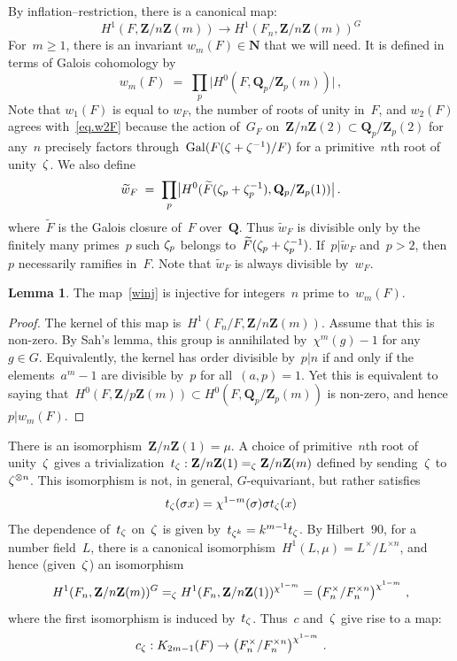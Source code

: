 \documentclass[12pt,reqno]{amsart}
\theoremstyle{definition}
\newtheorem{lemma}[theorem]{Lemma}
\newcommand{\changed}[1]{{#1}}
\def\be{\begin{equation}}
\def\ee{\end{equation}}
\def\={\;=\;}
\def\Q{\mathbf Q}   %
\def\Z{\mathbf Z}   %
\def\N{\mathbf N}   %
\def\nn{n}
\def\Gal{\mathrm{Gal}}
\def\Fgal{\widetilde{F}}
\def\ww{\widetilde w_F}
\begin{document}
By inflation--restriction, there is a canonical map: 
\be
\label{winj}
H^1(F,\Z/\nn\Z(m) ) \rightarrow H^1(F_\nn,\Z/\nn\Z(m) )^{G}
\ee
For~$m \ge 1$, there is an invariant $w_m(F)\in\N$ that we will need.
It is defined in terms of Galois cohomology by
$$ 
w_m(F) \= \prod_{p} \bigl|H^0(F,\Q_p/\Z_p(m) )\bigr|\,, 
$$
Note that $w_1(F)$ is equal to $w_F$, the number of 
roots of unity in~$F$, and $w_2(F)$ agrees with~\eqref{eq.w2F} 
\changed{because the action of~$G_F$ on~$\Z/\nn \Z(2) \subset \Q_p/\Z_p(2)$ for any~$\nn$
precisely factors through~$\Gal(F(\z + \z^{-1})/F)$ for a primitive~$\nn$th root
of unity~$\zeta$.}
We also define
\be
\label{wtwiddle}
\ww \= \prod_{p} \bigl|H^0(\Fgal(\z_p + \z^{-1}_p),\Q_p/\Z_p(1))\bigr|\,. 
\ee
where~$\Fgal$ is the Galois closure of~$F$ over~$\Q$.
Thus $\ww$ is divisible only by the finitely many primes~$p$ such $\zeta_p$ 
belongs to~$\Fgal(\z_p + \z\i_p)$. If~$p|\ww$ and~$p > 2$, then~$p$ 
necessarily ramifies in~$F$.  Note that $\ww$ is always divisible by~$w_F$.

\begin{lemma}
\label{lemma:sahinj}
The map~\eqref{winj} is injective for integers~$\nn$ prime to~$w_m(F)$.
\end{lemma}

\begin{proof}
The kernel of this map is~$H^1(F_\nn/F,\Z/\nn\Z(m) )$. Assume that this is 
non-zero.
By Sah's lemma, this group is annihilated by~$\chi^m(g) - 1$ for any~$g \in G$.
Equivalently, the kernel has order divisible by~$p | \nn$ if and only if the
elements~$a^m - 1$ are divisible by~$p$ for all~$(a,p) = 1$.
Yet this is equivalent to saying 
that~$H^0(F,\Z/p\Z(m) ) \subset H^0(F,\Q_p/\Z_p(m))$ is non-zero, and 
hence~$p | w_m(F)$.
\end{proof}


\changed{There is an isomorphism~$\Z/\nn\Z(1) = \mu$.
A choice of primitive~$\nn$th root of unity~$\zeta$ gives a trivialization~$t_{\z}:  
\Z/\nn\Z(1)   =_{\z} \Z/n\Z(m)$ defined by sending~$\zeta$ to~$\zeta^{\otimes n}$.
This isomorphism is not, in general, $G$-equivariant, but rather satisfies
\begin{equation}
t_{\zeta}(\sigma x) =  \chi^{1-m}(\sigma) \sigma t_{\zeta}(x)
\end{equation}
The dependence of~$t_{\zeta}$ on~$\zeta$ is given by~$t_{\zeta^k} = k^{m-1} t_{\zeta}$.
}
By Hilbert~$90$, 
for a number field~$L$, there is a canonical 
isomorphism~$H^1(L,\mu) = L^{\times}/L^{\times \nn}$, and hence
(given~$\zeta$) an isomorphism
$$
H^1(F_\nn,\Z/\nn\Z(m) )^{G}
 =_{\z}  H^1(F_\nn,\Z/\nn\Z(1))^{\chi^{1-m}}
 = \left(F_\nn^{\times}/F_\nn^{\times \nn}\right)^{\chi^{1-m}} \,,
$$
\changed{where the first isomorphism is induced by~$t_{\zeta}$.}
Thus~$c$ and~$\zeta$ give rise to a map:
\be
\label{defc}
c_\z: K_{2m-1}(F) \rightarrow 
\left(F_\nn^{\times}/F_\nn^{\times \nn}\right)^{\chi^{1-m}}\,.
\ee
\end{document}
